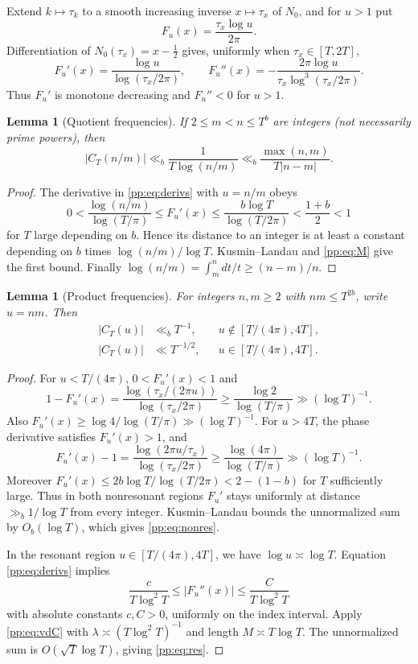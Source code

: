 \documentclass[11pt,reqno]{amsart}
\numberwithin{equation}{section}
\newtheorem{lemma}[theorem]{Lemma}
\begin{document}
Extend $k\mapsto\tau_k$ to a smooth increasing inverse $x\mapsto\tau_x$ of $N_0$, and for $u>1$ put
\begin{equation}
F_u(x)=\frac{\tau_x\log u}{2\pi}.
\label{pp:eq:F}
\end{equation}
Differentiation of $N_0(\tau_x)=x-\tfrac12$ gives, uniformly when $\tau_x\in[T,2T]$,
\begin{equation}
F_u'(x)=\frac{\log u}{\log(\tau_x/2\pi)},\qquad
F_u''(x)=-\frac{2\pi\log u}{\tau_x\log^3(\tau_x/2\pi)}.
\label{pp:eq:derivs}
\end{equation}
Thus $F_u'$ is monotone decreasing and $F_u''<0$ for $u>1$.

\begin{lemma}[Quotient frequencies]\label{pp:lem:quotient}
If $2\le m<n\le T^b$ are integers (not necessarily prime powers), then
\begin{equation}
|C_T(n/m)|\ll_b\frac{1}{T\log(n/m)}
\ll_b\frac{\max(n,m)}{T|n-m|}.
\label{pp:eq:quotient}
\end{equation}
\end{lemma}
\begin{proof}
The derivative in \eqref{pp:eq:derivs} with $u=n/m$ obeys
\[
0<\frac{\log(n/m)}{\log(T/\pi)}\le F_u'(x)
\le \frac{b\log T}{\log(T/2\pi)}<\frac{1+b}{2}<1
\]
for $T$ large depending on $b$. Hence its distance to an integer is at least a constant depending on $b$ times $\log(n/m)/\log T$. Kusmin--Landau and \eqref{pp:eq:M} give the first bound. Finally
$\log(n/m)=\int_m^n dt/t\ge(n-m)/n$.
\end{proof}

\begin{lemma}[Product frequencies]\label{pp:lem:product}
For integers $n,m\ge2$ with $nm\le T^{2b}$, write $u=nm$. Then
\begin{align}
|C_T(u)|&\ll_b T^{-1},&&u\notin[T/(4\pi),4T],\label{pp:eq:nonres}\\
|C_T(u)|&\ll T^{-1/2},&&u\in[T/(4\pi),4T].\label{pp:eq:res}
\end{align}
\end{lemma}
\begin{proof}
For $u<T/(4\pi)$, $0<F_u'(x)<1$ and
\[
1-F_u'(x)
=\frac{\log(\tau_x/(2\pi u))}{\log(\tau_x/2\pi)}
\ge\frac{\log2}{\log(T/\pi)}\gg(\log T)^{-1}.
\]
Also $F_u'(x)\ge\log4/\log(T/\pi)\gg(\log T)^{-1}$.
For $u>4T$, the phase derivative satisfies $F_u'(x)>1$, and
\[
 F_u'(x)-1=\frac{\log(2\pi u/\tau_x)}{\log(\tau_x/2\pi)}
\ge\frac{\log(4\pi)}{\log(T/\pi)}\gg(\log T)^{-1}.
\]
Moreover $F_u'(x)\le 2b\log T/\log(T/2\pi)<2-(1-b)$ for $T$ sufficiently large. Thus in both nonresonant regions $F_u'$ stays uniformly at distance $\gg_b1/\log T$ from every integer. Kusmin--Landau bounds the unnormalized sum by $O_b(\log T)$, which gives \eqref{pp:eq:nonres}.

In the resonant region $u\in[T/(4\pi),4T]$, we have $\log u\asymp\log T$. Equation \eqref{pp:eq:derivs} implies
\[
\frac{c}{T\log^2T}\le|F_u''(x)|\le\frac{C}{T\log^2T}
\]
with absolute constants $c,C>0$, uniformly on the index interval. Apply \eqref{pp:eq:vdC} with $\lambda\asymp(T\log^2T)^{-1}$ and length $M\asymp T\log T$. The unnormalized sum is $O(\sqrt T\log T)$, giving \eqref{pp:eq:res}.
\end{proof}
\end{document}
